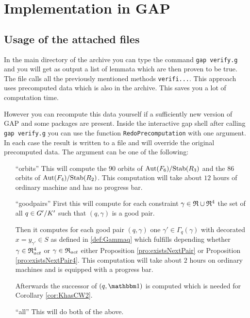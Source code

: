 \documentclass[a4paper,11pt]{amsart}
\begin{document}
\section{Implementation in GAP}
\subsection{Usage of the attached files}
In the main directory of the archive you can type the command \lstinline{gap verify.g} and 
you will get as output a list of lemmata which are then proven to be true. 
The file calls all the previously mentioned methods \lstinline{verifi...}.
This approach uses
precomputed data which is also in the archive. This saves you a lot of computation time.

However you can recompute this data yourself if a sufficiently new version of GAP and
some packages are present. Inside the interactive gap shell after calling \lstinline{gap verify.g}
you can use the function \lstinline{RedoPrecomputation} with one argument. In each case
the result is written to a file and will override the original precomputed data. The 
argument can be one of the following:
\begin{itemize}
    \item [``orbits''] This will compute the $90$ orbits of ${\textup{Aut}(F_6)/\textup{Stab}(R_3)}$ and the
		       $86$ orbits of ${\textup{Aut}(F_4)/\textup{Stab}(R_2)}$. This computation will take
		       about $12$ hours of ordinary machine and has no progress bar.
   \item [``goodpairs''] First this will compute for each constraint $\gamma\in\mathfrak{R}\cup\mathfrak{R}^4$ 
		      the set of all $q\in{G'/K'}$ such that $(q,\gamma)$ is a good pair.
		      
		      Then it computes for each good pair $(q,\gamma)$ one $\gamma'\in\Gamma_q(\gamma)$
		      with decorated $x=y_{\gamma'}\in S$ as defined in \ref{def:Gammaq} which 
		      fulfills depending whether $\gamma\in\mathfrak{R}^4_{act}$ or $\gamma\in\mathfrak{R}_{act}$ 
		      either Proposition \ref{pro:existsNextPair} or Proposition \ref{pro:existsNextPair4}.
		      This computation will take about $2$ hours on ordinary machines and is equipped 
		      with a progress bar. 
		      
		      Afterwards the successor of $(q,\id)$ is computed which is needed for 
		      Corollary \ref{cor:KhasCW2}. 
  \item [``all''] This will do both of the above.		      
   \end{itemize}
  
\end{document}
